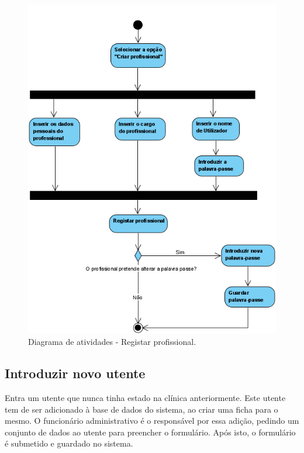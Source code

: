 \documentclass[11pt,a4paper,twoside]{report}
\begin{document}
\begin{figure}[H]
	\centering
	\includegraphics[width=0.6\linewidth]{image/Atividades/Registar Profissional}
	\caption{Diagrama de atividades - Registar profissional.}
	\label{fig:registarpessoal}
\end{figure}


\subsection{Introduzir novo utente}

Entra um utente que nunca tinha estado na clínica anteriormente. Este utente tem de ser adicionado à base de dados do sistema, ao criar uma ficha para o mesmo. O funcionário administrativo é o responsável por essa adição, pedindo um conjunto de dados ao utente para preencher o formulário. Após isto, o formulário é submetido e guardado no sistema.
\end{document}
